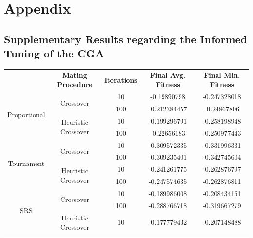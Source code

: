 \documentclass[10pt]{article}
\begin{document}
\section{Appendix}
\subsection{Supplementary Results regarding the Informed Tuning of the CGA}

\begin{table}[H]
    \centering
    \begin{tabular}{|*{5}{c|}}
        \hline
        \renewcommand{\arraystretch}{1.5}
        \multirow{2}{*}{\textbf{Selection Method}} & \multirow{2}{*}{\textbf{Mating Procedure}} & \multirow{2}{*}{\textbf{Iterations}} & \multirow{2}{*}{\textbf{Final Avg. Fitness}} & \multirow{2}{*}{\textbf{Final Min. Fitness}} \\
        & & & & \\
        \hline
        \multirow{4}{*}{Proportional} & \multirow{2}{*}{Crossover} & 10 & -0.19890798 & -0.247328018 \\
        & &\cellcolor{lightgray} 100 &\cellcolor{lightgray} -0.212384457 &\cellcolor{lightgray} -0.24867806 \\
        \cline{2-5}
        & \multirow{2}{*}{Heuristic Crossover} & 10 & -0.199296791 & -0.258198948 \\
        & &\cellcolor{lightgray} 100 &\cellcolor{lightgray} -0.22656183 & \cellcolor{lightgray} -0.250977443 \\
        \hline
        \multirow{4}{*}{Tournament} & \multirow{2}{*}{Crossover} & 10 & -0.309572335 & -0.331996331 \\
        & &\cellcolor{lightgray} 100 &\cellcolor{lightgray} -0.309235401 &\cellcolor{lightgray} -0.342745604 \\
        \cline{2-5}
        & \multirow{2}{*}{Heuristic Crossover} & 10 & -0.241261775 & -0.262876797 \\
        & &\cellcolor{lightgray} 100 &\cellcolor{lightgray} -0.247574635 &\cellcolor{lightgray} -0.262876811 \\
        \hline
        \multirow{4}{*}{SRS} & \multirow{2}{*}{Crossover} & 10 & -0.189986008 & -0.208434151 \\
        & &\cellcolor{lightgray} 100 &\cellcolor{lightgray} -0.288766718 &\cellcolor{lightgray} -0.319667279 \\
        \cline{2-5}
        & \multirow{2}{*}{Heuristic Crossover} & 10 & -0.177779432 & -0.207148488 \\

\end{tabular}
\end{table}
\end{document}
